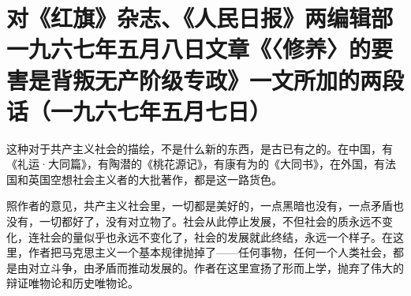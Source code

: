 \section[对《红旗》杂志、《人民日报》两编辑部一九六七年五月八日文章《〈修养〉的要害是背叛无产阶级专政》一文所加的两段话（一九六七年五月七日）]{对《红旗》杂志、《人民日报》两编辑部一九六七年五月八日文章《〈修养〉的要害是背叛无产阶级专政》一文所加的两段话（一九六七年五月七日）}


这种对于共产主义社会的描绘，不是什么新的东西，是古已有之的。在中国，有《礼运·大同篇》，有陶潜的《桃花源记》，有康有为的《大同书》，在外国，有法国和英国空想社会主义者的大批著作，都是这一路货色。

照作者的意见，共产主义社会里，一切都是美好的，一点黑暗也没有，一点矛盾也没有，一切都好了，没有对立物了。社会从此停止发展，不但社会的质永远不变化，连社会的量似乎也永远不变化了，社会的发展就此终结，永远一个样子。在这里，作者把马克思主义一个基本规律抛掉了——任何事物，任何一个人类社会，都是由对立斗争，由矛盾而推动发展的。作者在这里宣扬了形而上学，抛弃了伟大的辩证唯物论和历史唯物论。


